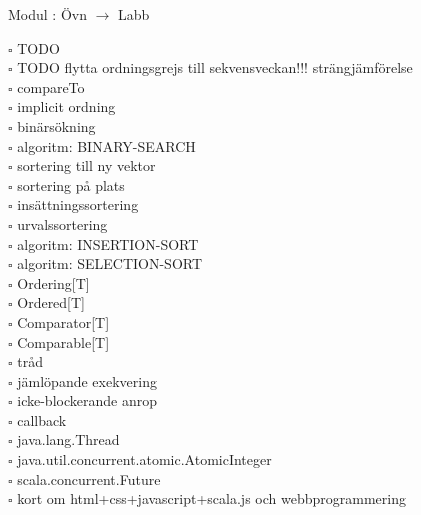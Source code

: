 
    Modul : Övn  $\rightarrow$ Labb 
    \begin{multicols}{3}\SlideFontTiny
    $\square$ TODO \\
$\square$ TODO flytta ordningsgrejs till sekvensveckan!!! strängjämförelse \\
$\square$ compareTo \\
$\square$ implicit ordning \\
$\square$ binärsökning \\
$\square$ algoritm: BINARY-SEARCH \\
$\square$ sortering till ny vektor \\
$\square$ sortering på plats \\
$\square$ insättningssortering \\
$\square$ urvalssortering \\
$\square$ algoritm: INSERTION-SORT \\
$\square$ algoritm: SELECTION-SORT \\
$\square$ Ordering[T] \\
$\square$ Ordered[T] \\
$\square$ Comparator[T] \\
$\square$ Comparable[T] \\
$\square$ tråd \\
$\square$ jämlöpande exekvering \\
$\square$ icke-blockerande anrop \\
$\square$ callback \\
$\square$ java.lang.Thread \\
$\square$ java.util.concurrent.atomic.AtomicInteger \\
$\square$ scala.concurrent.Future \\
$\square$ kort om html+css+javascript+scala.js och webbprogrammering \\
    \end{multicols}
    